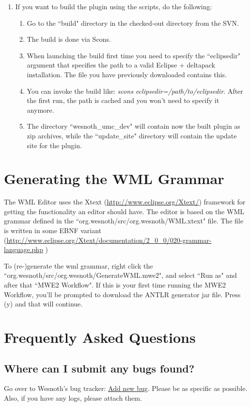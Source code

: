 \documentclass[10pt]{article}
\begin{document}
\begin{enumerate}
  \item If you want to build the plugin using the scripts, do the following:
  \begin{enumerate}
    \item Go to the ``build" directory in the checked-out directory from the SVN.
    \item The build is done via Scons.
    \item When launching the build first time you need to specify the ``eclipsedir" argument that specifies the path to a valid Eclipse + deltapack installation. The file you have previously downloaded contains this.
    \item You can invoke the build like: \textit{scons  eclipsedir=/path/to/eclipsedir}. After the first run, the path is cached and you won't need to specify it anymore.
    \item The directory ``wesnoth\_umc\_dev" will contain now the built plugin as zip archives, while the ``update\_site" directory will contain the update site for the plugin.
  \end{enumerate}
\end{enumerate}

\section{Generating the WML Grammar}
The WML Editor uses the Xtext (\href{http://www.eclipse.org/Xtext/}{http://www.eclipse.org/Xtext/}) framework for getting the functionality an editor should have. The editor is based on the WML grammar defined in the ``org.wesnoth/src/org.wesnoth/WML.xtext" file.
The file is written in some EBNF variant (\href{http://www.eclipse.org/Xtext/documentation/2\_0\_0/020-grammar-language.php}{http://www.eclipse.org/Xtext/documentation/2\_0\_0/020-grammar-language.php} )

To (re-)generate the wml grammar, right click the ``org.wesnoth/src/org.wesnoth/GenerateWML.mwe2", and select ``Run as" and after that ``MWE2 Workflow". If this is your first time running the MWE2 Workflow, you'll be prompted to download the ANTLR generator jar file. Press (y) and that will continue.

\section{Frequently Asked Questions}
\subsection{Where can I submit any bugs found?}
Go over to Wesnoth's bug tracker: \href{https://gna.org/bugs/?func=additem&group=wesnoth&bug_group_id=116}{Add new bug}. Please be as specific as possible. Also, if you have any logs, please attach them.
\end{document}
